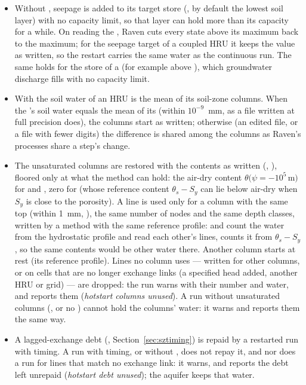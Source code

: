 \begin{itemize}
\item Without , seepage is added to its target store (, by default the
lowest soil layer) with no capacity limit, so that layer can hold more than its capacity for a while. On reading the
, Raven cuts every state above its maximum back to the maximum; for the seepage target of a coupled HRU it keeps
the value as written, so the restart carries the same water as the continuous run. The same holds for the store of a
 (for example  above ), which groundwater discharge fills with no
capacity limit.
\item With  the soil water of an HRU is the mean of its soil-zone columns. When the 's soil
water equals the mean of its  (within $10^{-9}$~mm, as a file written at full precision does), the
columns start as written; otherwise (an edited file, or a file with fewer digits) the difference is shared among the columns as Raven's
processes share a step's change.
\item The unsaturated columns are restored with the contents as written (,
), floored only at what the method can hold: the air-dry content
$\theta(\psi=-10^5$\,m$)$ for  and , zero for  (whose reference content
$\theta_s-S_y$ can lie below air-dry when $S_y$ is close to the porosity). A line is used only for a column with the same
top (within 1~mm, ), the same number of nodes and the same depth classes, written by a method with
the same reference profile:  and  count the water from the hydrostatic profile and read each
other's lines,  counts it from $\theta_s-S_y$, so the same contents would be other water there. Another
column starts at rest (its reference profile). Lines no column uses --- written for other columns, or on cells that are no
longer exchange links (a specified head added, another HRU or grid) --- are dropped: the run warns with their number and
water, and  reports them (\emph{hotstart columns unused}). A run without unsaturated columns
(, or no ) cannot hold the columns' water: it warns and reports them the
same way.
\item A lagged-exchange debt (, Section~\ref{sec:sztiming}) is repaid by a restarted run with
 timing. A run with  timing, or without , does not repay it, and nor does a
run for lines that match no exchange link: it warns, and  reports the debt left unrepaid
(\emph{hotstart debt unused}); the aquifer keeps that water.
\end{itemize}
